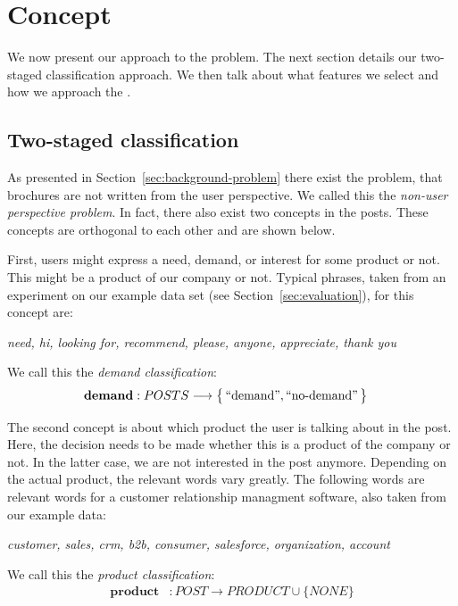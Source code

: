\section{Concept}
\label{sec:concept}
We now present our approach to the \nto problem.
The next section details our two-staged classification approach.
We then talk about what features we select and how we approach the .

\subsection{Two-staged classification}
As presented in Section~\ref{sec:background-problem} there exist the problem, that brochures are not written from the user perspective.
We called this the \emph{non-user perspective problem}.
In fact, there also exist two concepts in the posts.
These concepts are orthogonal to each other and are shown below.

First, users might express a need, demand, or interest for some product or not.
This might be a product of our company or not.
Typical phrases, taken from an experiment on our example data set (see Section~\ref{sec:evaluation}), for this concept are:
\begin{center}
	\textit{need, hi, looking for, recommend, please, anyone, appreciate, thank you}
\end{center}
We call this the \emph{demand classification}:
\begin{align}
	\mathbf{demand}&: POSTS \longrightarrow \big\{ \operatorname{``demand''}, \operatorname{``no-demand''} \big\}
\end{align}

The second concept is about which product the user is talking about in the post.
Here, the decision needs to be made whether this is a product of the company or not.
In the latter case, we are not interested in the post anymore.
Depending on the actual product, the relevant words vary greatly.
The following words are relevant words for a customer relationship managment software, also taken from our example data:
\begin{center}
	\textit{customer, sales, crm, b2b, consumer, salesforce, organization, account}
\end{center}

We call this the \emph{product classification}:
\begin{align}
	\mathbf{product}&: POST \longrightarrow  PRODUCT \cup \big\{ NONE \big\}
\end{align}

